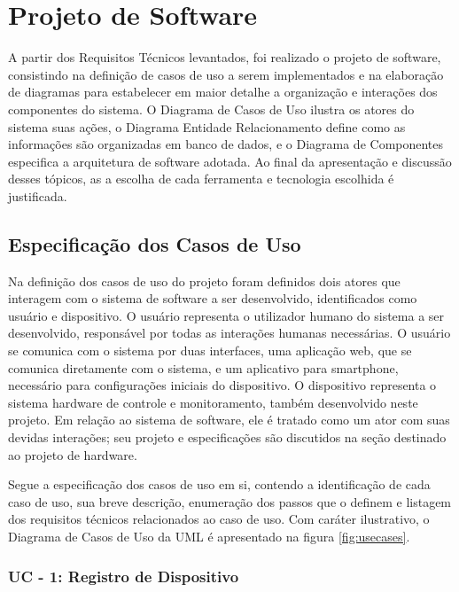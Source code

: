 \section{Projeto de Software}

A partir dos Requisitos Técnicos levantados, foi realizado o projeto de software, consistindo na definição de casos de uso a serem implementados 
e na elaboração de diagramas para estabelecer em maior detalhe a organização e interações dos componentes do sistema. O Diagrama de Casos de Uso 
ilustra os atores do sistema suas ações, o Diagrama Entidade Relacionamento define como as informações são organizadas em banco de dados, e o 
Diagrama de Componentes especifica a arquitetura de software adotada. Ao final da apresentação e discussão desses tópicos, as a escolha de cada 
ferramenta e tecnologia escolhida é justificada.

\subsection{Especificação dos Casos de Uso}

Na definição dos casos de uso do projeto foram definidos dois atores que interagem com o sistema de software a ser desenvolvido, identificados como 
usuário e dispositivo. O usuário representa o utilizador humano do sistema a ser desenvolvido, responsável por todas as interações humanas necessárias. 
O usuário se comunica com o sistema por duas interfaces, uma aplicação web, que se comunica diretamente com o sistema, e um aplicativo para smartphone, necessário para configurações iniciais do dispositivo. O dispositivo representa o sistema hardware de controle e monitoramento, também desenvolvido neste projeto. Em relação ao sistema de software, ele é tratado como um ator com suas devidas interações; seu projeto e especificações são discutidos na seção destinado ao projeto de hardware.

Segue a especificação dos casos de uso em si, contendo a identificação de cada caso de uso, sua breve descrição, enumeração dos passos que o definem e 
listagem dos requisitos técnicos relacionados ao caso de uso. Com caráter ilustrativo, o Diagrama de Casos de Uso da UML é apresentado na figura \ref{fig:usecases}.

\subsubsection*{UC - 1: Registro de Dispositivo} 

